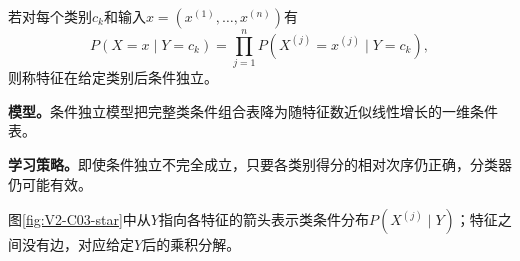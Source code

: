 \documentclass[UTF8,a4paper,11pt,openany]{ctexbook}
\begin{document}
\setcounter{page}{264}
\setcounter{chapter}{14}
\setcounter{figure}{0}
\pagestyle{headings}
\begin{definition}[朴素贝叶斯条件独立模型]
若对每个类别$c_k$和输入$x=(x^{(1)},\ldots,x^{(n)})$有
\[
P(X=x\mid Y=c_k)=\prod_{j=1}^{n}P(X^{(j)}=x^{(j)}\mid Y=c_k),
\]
则称特征在给定类别后条件独立。
\end{definition}
\textbf{模型。}条件独立模型把完整类条件组合表降为随特征数近似线性增长的一维条件表。

\textbf{学习策略。}即使条件独立不完全成立，只要各类别得分的相对次序仍正确，分类器仍可能有效。

图\ref{fig:V2-C03-star}中从$Y$指向各特征的箭头表示类条件分布$P(X^{(j)}\mid Y)$；特征之间没有边，对应给定$Y$后的乘积分解。
\end{document}
